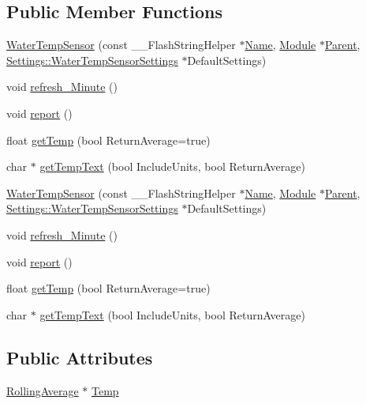 \subsection*{Public Member Functions}
\begin{DoxyCompactItemize}
\item 
\hyperlink{class_water_temp_sensor_a88e6058500175b82a043ad682f968011}{Water\+Temp\+Sensor} (const \+\_\+\+\_\+\+Flash\+String\+Helper $\ast$\hyperlink{class_common_aeea91a726dbe988e515057b32ba0726f}{Name}, \hyperlink{class_module}{Module} $\ast$\hyperlink{class_water_temp_sensor_a955eb4c3335d1971cec6c2d68d29c8c6}{Parent}, \hyperlink{struct_settings_1_1_water_temp_sensor_settings}{Settings\+::\+Water\+Temp\+Sensor\+Settings} $\ast$Default\+Settings)
\item 
void \hyperlink{class_water_temp_sensor_ad3b641c41aea8f28b5b1640e16e2ccde}{refresh\+\_\+\+Minute} ()
\item 
void \hyperlink{class_water_temp_sensor_a116d049ce3a6d7150494eb938a6fb6cc}{report} ()
\item 
float \hyperlink{class_water_temp_sensor_a8643876189e7bbc303bc7f4f7da66f19}{get\+Temp} (bool Return\+Average=true)
\item 
char $\ast$ \hyperlink{class_water_temp_sensor_a812f3e2f65426efdf594e599d0e8a24d}{get\+Temp\+Text} (bool Include\+Units, bool Return\+Average)
\item 
\hyperlink{class_water_temp_sensor_a88e6058500175b82a043ad682f968011}{Water\+Temp\+Sensor} (const \+\_\+\+\_\+\+Flash\+String\+Helper $\ast$\hyperlink{class_common_aeea91a726dbe988e515057b32ba0726f}{Name}, \hyperlink{class_module}{Module} $\ast$\hyperlink{class_water_temp_sensor_a955eb4c3335d1971cec6c2d68d29c8c6}{Parent}, \hyperlink{struct_settings_1_1_water_temp_sensor_settings}{Settings\+::\+Water\+Temp\+Sensor\+Settings} $\ast$Default\+Settings)
\item 
void \hyperlink{class_water_temp_sensor_ad3b641c41aea8f28b5b1640e16e2ccde}{refresh\+\_\+\+Minute} ()
\item 
void \hyperlink{class_water_temp_sensor_a116d049ce3a6d7150494eb938a6fb6cc}{report} ()
\item 
float \hyperlink{class_water_temp_sensor_a8643876189e7bbc303bc7f4f7da66f19}{get\+Temp} (bool Return\+Average=true)
\item 
char $\ast$ \hyperlink{class_water_temp_sensor_a1d53649a788fc53f1911e5b3d8c8046d}{get\+Temp\+Text} (bool Include\+Units, bool Return\+Average)
\end{DoxyCompactItemize}
\subsection*{Public Attributes}
\begin{DoxyCompactItemize}
\item 
\hyperlink{class_rolling_average}{Rolling\+Average} $\ast$ \hyperlink{class_water_temp_sensor_a6f6623a98752218ef94136d60280ff8e}{Temp}
\end{DoxyCompactItemize}
